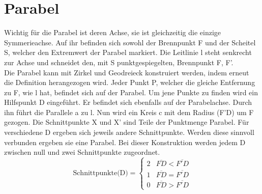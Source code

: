 \section{Parabel}
Wichtig für die Parabel ist deren Achse, sie ist gleichzeitig die einzige Symmerieachse. Auf ihr befinden sich sowohl der Brennpunkt F und der Scheitel S, welcher den Extremwert der Parabel markiert. Die Leitlinie l steht senkrecht zur Achse und schneidet den, mit S punktgespiegelten, Brennpunkt F, F'.\\
Die Parabel kann mit Zirkel und Geodreieck konstruiert werden, indem erneut die Definition herangezogen wird. Jeder Punkt P, welcher die gleiche Entfernung zu F, wie l hat, befindet sich auf der Parabel. Um jene Punkte zu finden wird ein Hilfspunkt D eingeführt. Er befindet sich ebenfalls auf der Parabelachse. Durch ihn führt die Parallele a zu l. Nun wird ein Kreis c mit dem Radius (F'D) um F gezogen. Die Schnittpunkte X und X' sind Teile der Punktmenge Parabel. Für verschiedene D ergeben sich jeweils andere Schnittpunkte. Werden diese sinnvoll verbunden ergeben sie eine Parabel. Bei dieser Konstruktion werden jedem D zwischen null und zwei Schnittpunkte zugeordnet.
\begin{displaymath}
   \text{Schnittpunkte(D)} = \left\{
     \begin{array}{lr}
       2 & \overline{FD} < \overline{F'D}\\
       1 & \overline{FD} = \overline{F'D}\\
       0 & \overline{FD} > \overline{F'D}
     \end{array}
   \right.
\end{displaymath}
